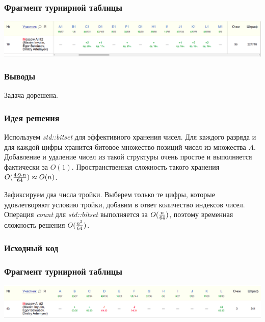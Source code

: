 \subsubsection*{Фрагмент турнирной таблицы}
\includegraphics[width=\textwidth]{images/mw1.png}\newline\noindent
\subsubsection*{Выводы}
Задача дорешена.
\pagebreak


\subsubsection*{Идея решения}
Используем \textit{std::bitset} для эффективного хранения чисел. Для каждого разряда и для каждой цифры хранится битовое множество позиций чисел из множества $A$. Добавление и удаление чисел из такой структуры очень простое и выполняется фактически за $O(1)$. Пространственная сложность такого хранения $O({{4 \cdot 9 \cdot n}\over{64}}) \approx O(n)$.

Зафиксируем два числа тройки. Выберем только те цифры, которые удовлетворяют условию тройки, добавим в ответ количество индексов чисел. Операция \textit{count} для \textit{std::bitset} выполняется за $O({n \over 64})$, поэтому временная сложность решения $O({{n ^ 3} \over 64})$.
\subsubsection*{Исходный код}

\subsubsection*{Фрагмент турнирной таблицы}
\includegraphics[width=\textwidth]{images/mw4.png}\newline\noindent
